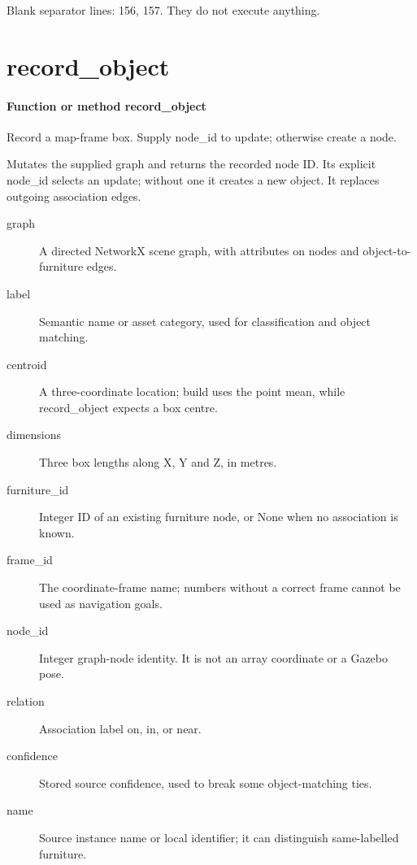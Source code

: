 \documentclass[11pt,a4paper]{book}
\begin{document}
Blank separator lines: 156, 157. They do not execute anything.

\section{record\_object}

\paragraph{Function or method record\_object}
Record a map-frame box. Supply node\_id to update; otherwise create a node.

Mutates the supplied graph and returns the recorded node ID. Its explicit node\_id selects an update; without one it creates a new object. It replaces outgoing association edges.

\begin{description}
\item[graph] A directed NetworkX scene graph, with attributes on nodes and object-to-furniture edges.
\item[label] Semantic name or asset category, used for classification and object matching.
\item[centroid] A three-coordinate location; build uses the point mean, while record\_object expects a box centre.
\item[dimensions] Three box lengths along X, Y and Z, in metres.
\item[furniture\_id] Integer ID of an existing furniture node, or None when no association is known.
\item[frame\_id] The coordinate-frame name; numbers without a correct frame cannot be used as navigation goals.
\item[node\_id] Integer graph-node identity. It is not an array coordinate or a Gazebo pose.
\item[relation] Association label on, in, or near.
\item[confidence] Stored source confidence, used to break some object-matching ties.
\item[name] Source instance name or local identifier; it can distinguish same-labelled furniture.
\end{description}
\end{document}
